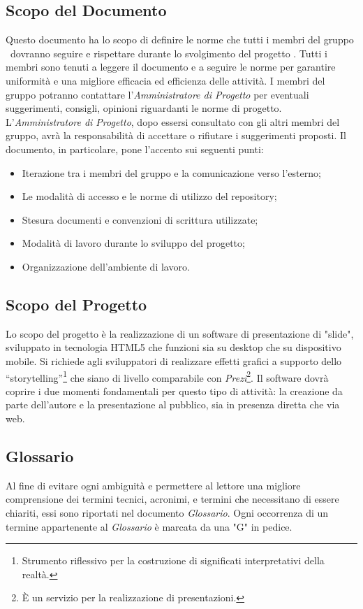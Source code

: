 \subsection{Scopo del Documento}
Questo documento ha lo scopo di definire le norme che tutti i membri del gruppo \GRUPPO\ dovranno seguire e rispettare durante lo svolgimento del progetto \PROGETTO. Tutti i membri sono tenuti a leggere il documento e a seguire le norme per garantire uniformità e una migliore efficacia ed efficienza delle attività.
I membri del gruppo potranno contattare l'\textit{Amministratore di Progetto} per eventuali suggerimenti, consigli, opinioni riguardanti le norme di progetto. 
L'\textit{Amministratore di Progetto}, dopo essersi consultato con gli altri membri del gruppo, avrà la responsabilità di accettare o rifiutare i suggerimenti proposti. 
Il documento, in particolare, pone l'accento sui seguenti punti:

\begin{itemize}
	\item Iterazione tra i membri del gruppo e la comunicazione verso l'esterno;
	\item Le modalità di accesso e le norme di utilizzo del \gls{repository};
	\item Stesura documenti e convenzioni di scrittura utilizzate;
	\item Modalità di lavoro durante lo sviluppo del progetto;
	\item Organizzazione dell'ambiente di lavoro.
\end{itemize}

\subsection{Scopo del Progetto}
Lo scopo del progetto è la realizzazione di un software di presentazione di "slide", sviluppato in tecnologia \gls{HTML5} che funzioni sia su desktop che su dispositivo mobile.
Si richiede agli sviluppatori di realizzare effetti grafici a supporto dello “storytelling”\footnote{Strumento riflessivo per la costruzione di significati interpretativi della realtà.} che siano di livello comparabile con \textit{Prezi}\footnote{È un servizio per la realizzazione di presentazioni.}.
Il software dovrà coprire i due momenti fondamentali per questo tipo di attività: la creazione da parte dell'autore e la presentazione al pubblico, sia in presenza diretta che via web.

\subsection{Glossario}
Al fine di evitare ogni ambiguità e permettere al lettore una migliore comprensione dei termini tecnici, acronimi, e termini che necessitano di essere chiariti,  essi sono riportati nel documento \textit{Glossario}. 
Ogni occorrenza  di un termine appartenente al \textit{Glossario} è marcata da una "G" in pedice.

